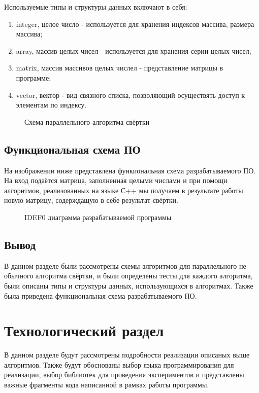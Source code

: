 Используемые типы и структуры данных включают в себя:
\begin{enumerate}
	\item integer, целое число - используется для хранения индексов массива, размера массива;
	\item array, массив целых чисел - используется для хранения серии целых чисел;
	\item matrix, массив массивов целых числел - представление матрицы в программе;
	\item vector, вектор - вид связного списка, позволяющий осуществять доступ к элементам по индексу.
\end{enumerate}

\begin{figure}[ph!]
	\caption{Схема параллельного алгоритма свёртки}
\end{figure}

\section{Функциональная схема ПО}
На изображении ниже представлена функиональная схема разрабатываемого ПО. На вход подаётся матрица, заполненная целыми числами и при помощи алгоритмов, реализованных на языке С++ мы получаем в результате работы новую матрицу, содерждащую в себе результат свёртки.

\begin{figure}[ph!]
	\caption{IDEF0 диаграмма разрабатываемой программы}
\end{figure}

\section{Вывод}
В данном разделе были рассмотрены схемы алгоритмов для параллельного не обычного алгоритма свёртки, и были определены тесты для каждого алгоритма, были описаны типы и структуры данных, использующихся в алгоритмах. Также была приведена функциональная схема разрабатываемого ПО.

\chapter{Технологический раздел}

В данном разделе будут рассмотрены подробности реализации описаных выше алгоритмов. Также будут обоснованы выбор языка программирования для реализации, выбор библиотек для проведения экспериментов и представлены важные фрагменты кода написанной в рамках работы программы.

